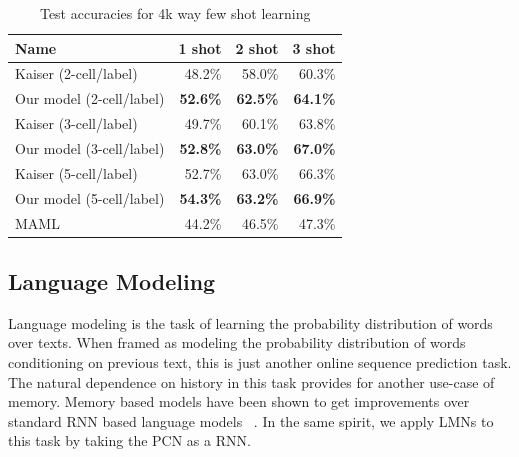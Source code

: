 \documentclass[letterpaper]{article} %
\begin{document}

\begin{table}[!htb]
\begin{center}
\begin{tabular}{|l|r|r|r|} \hline
Name &   1 shot &   2 shot &  3 shot \\ \hline
Kaiser (2-cell/label) & 48.2\%	&	58.0\%	&	60.3\% \\ 
Our model (2-cell/label) & \textbf{52.6\%}	&	\textbf{62.5\%}	&	\textbf{64.1\%} \\ \hline
Kaiser (3-cell/label) & 49.7\%	&	60.1\%	&	63.8\% \\ 
Our model (3-cell/label) & \textbf{52.8\%}	&	\textbf{63.0\%}	&	\textbf{67.0\%} \\ \hline
Kaiser (5-cell/label) & 52.7\%	&	63.0\%	&	66.3\% \\ 
Our model (5-cell/label) & \textbf{54.3\%}	&	\textbf{63.2\%}	&	\textbf{66.9\%} \\ \hline
MAML & 44.2\% & 46.5\% & 47.3\%  \\ \hline
\end{tabular}
\end{center}
\caption{\label{fewshot-results1} Test accuracies for 4k way few shot learning}

\end{table}





\subsection{Language Modeling}
Language modeling is the task of learning the probability distribution of words over texts. When framed as modeling the probability distribution of words conditioning on previous text, this is just another online sequence prediction task. The natural dependence on history in this task provides for another use-case of memory. Memory based models have been shown to get improvements over standard RNN based language models ~\cite{SukhbaatarSWF15,merity2016pointer,grave2016improving}.
In the same spirit, we apply LMNs to this task by taking the PCN as a RNN.
\end{document}
